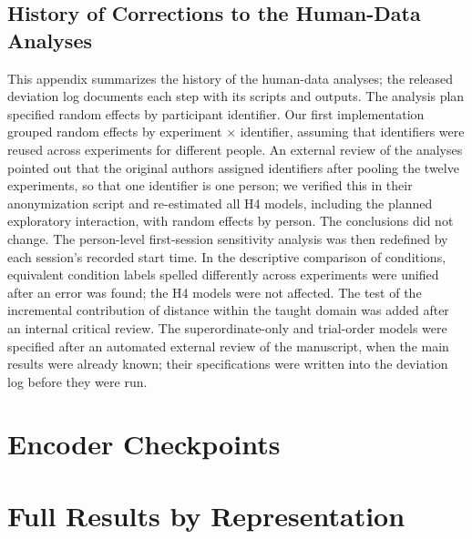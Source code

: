 \documentclass[11pt]{article}
\begin{document}
\subsection{History of Corrections to the Human-Data Analyses}
\label{app:history}

This appendix summarizes the history of the human-data analyses; the released deviation log documents each step with its scripts and outputs. The analysis plan specified random effects by participant identifier. Our first implementation grouped random effects by experiment $\times$ identifier, assuming that identifiers were reused across experiments for different people. An external review of the analyses pointed out that the original authors assigned identifiers after pooling the twelve experiments, so that one identifier is one person; we verified this in their anonymization script and re-estimated all H4 models, including the planned exploratory interaction, with random effects by person. The conclusions did not change. The person-level first-session sensitivity analysis was then redefined by each session's recorded start time. In the descriptive comparison of conditions, equivalent condition labels spelled differently across experiments were unified after an error was found; the H4 models were not affected. The test of the incremental contribution of distance within the taught domain was added after an internal critical review. The superordinate-only and trial-order models were specified after an automated external review of the manuscript, when the main results were already known; their specifications were written into the deviation log before they were run.

\section{Encoder Checkpoints}
\label{app:checkpoints}

\begin{table}[!htbp]
\centering\small

\caption{Encoders and Pinned Checkpoint Revisions}
\label{tab:checkpoints}
\par{}
\end{table}

\clearpage
\section{Full Results by Representation}
\label{app:full}
\end{document}
